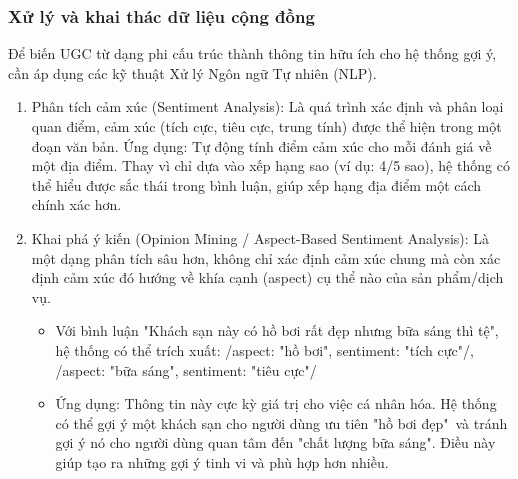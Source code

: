 \subsubsection{Xử lý và khai thác dữ liệu cộng đồng}
Để biến UGC từ dạng phi cấu trúc thành thông tin hữu ích cho hệ thống gợi ý, cần áp dụng các kỹ thuật Xử lý Ngôn ngữ Tự nhiên (NLP).
\begin{enumerate}
    \item Phân tích cảm xúc (Sentiment Analysis): Là quá trình xác định và phân loại quan điểm, cảm xúc (tích cực, tiêu cực, trung tính) được thể hiện trong một đoạn văn bản. Ứng dụng: Tự động tính điểm cảm xúc cho mỗi đánh giá về một địa điểm. Thay vì chỉ dựa vào xếp hạng sao (ví dụ: 4/5 sao), hệ thống có thể hiểu được sắc thái trong bình luận, giúp xếp hạng địa điểm một cách chính xác hơn.
    \item Khai phá ý kiến (Opinion Mining / Aspect-Based Sentiment Analysis): Là một dạng phân tích sâu hơn, không chỉ xác định cảm xúc chung mà còn xác định cảm xúc đó hướng về khía cạnh (aspect) cụ thể nào của sản phẩm/dịch vụ. 
    \begin{itemize}
        \item Với bình luận "Khách sạn này có hồ bơi rất đẹp nhưng bữa sáng thì tệ", hệ thống có thể trích xuất: /{aspect: "hồ bơi", sentiment: "tích cực"/}, /{aspect: "bữa sáng", sentiment: "tiêu cực"/}
        \item Ứng dụng: Thông tin này cực kỳ giá trị cho việc cá nhân hóa. Hệ thống có thể gợi ý một khách sạn cho người dùng ưu tiên "hồ bơi đẹp"\ và tránh gợi ý nó cho người dùng quan tâm đến "chất lượng bữa sáng". Điều này giúp tạo ra những gợi ý tinh vi và phù hợp hơn nhiều.
    \end{itemize}
\end{enumerate}
